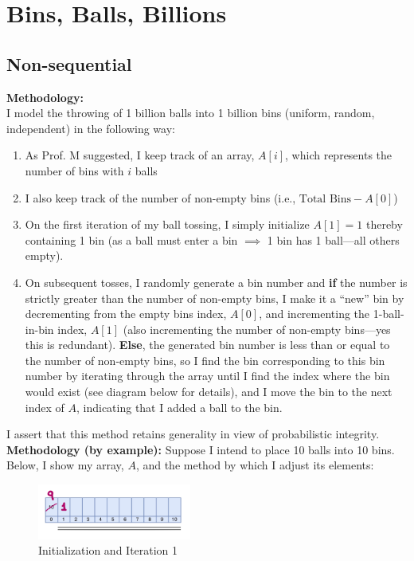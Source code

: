 \documentclass[conference]{styles/acmsiggraph}
\newcommand{\?}{\stackrel{?}{=}}
\begin{document}
\newpage

\section{Bins, Balls, Billions}
\subsection{Non-sequential}
\textbf{Methodology:}\\
I model the throwing of 1 billion balls into 1 billion bins (uniform, random, independent) in the following way:
\begin{enumerate}
    \item As Prof. M suggested, I keep track of an array, $A[i]$, which represents the number of bins with $i$ balls
    \item I also keep track of the number of non-empty bins (i.e., $\text{Total Bins} - A[0]$)
    \item On the first iteration of my ball tossing, I simply initialize $A[1] = 1$ thereby containing 1 bin (as a ball must enter a bin $\implies$ 1 bin has 1 ball---all others empty).
    \item On subsequent tosses, I randomly generate a bin number and \textbf{if} the number is strictly greater than the number of non-empty bins, I make it a \enquote{new} bin by decrementing from the empty bins index, $A[0]$, and incrementing the 1-ball-in-bin index, $A[1]$ (also incrementing the number of non-empty bins---yes this is redundant).  \textbf{Else}, the generated bin number is less than or equal to the number of non-empty bins, so I find the bin corresponding to this bin number by iterating through the array until I find the index where the bin would exist (see diagram below for details), and I move the bin to the next index of $A$, indicating that I added a ball to the bin.
\end{enumerate}

I assert that this method retains generality in view of probabilistic integrity. \\

\textbf{Methodology (by example):}  Suppose I intend to place 10 balls into 10 bins.  Below, I show my array, $A$, and the method by which I adjust its elements:
\begin{figure}[h!]
    \centering
    \includegraphics[width=0.45\textwidth]{Problem5.1Figures/start.png}
    \caption{Initialization and Iteration 1}
    \label{fig:start}
\end{figure}
\FloatBarrier
\end{document}
